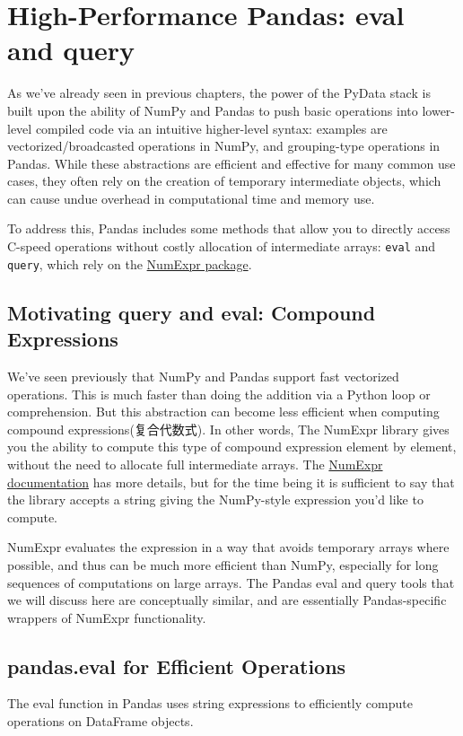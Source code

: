 \chapter{High-Performance Pandas: eval and query\label{Ch24}}
As we've already seen in previous chapters, the power of the PyData stack is built
upon the ability of NumPy and Pandas to push basic operations into lower-level compiled code via an intuitive higher-level syntax: examples are vectorized/broadcasted
operations in NumPy, and grouping-type operations in Pandas. While these abstractions are efficient and effective for many common use cases, they often rely on the
creation of temporary intermediate objects, which can cause undue overhead in computational time and memory use.

To address this, Pandas includes some methods that allow you to directly access C-speed operations without costly allocation of intermediate arrays: \verb|eval| and \verb|query|,
which rely on the \href{https://github.com/pydata/numexpr}{NumExpr package}.

\section{Motivating query and eval: Compound Expressions}
We've seen previously that NumPy and Pandas support fast vectorized operations. This is much faster than doing the addition via a Python loop or comprehension. But this abstraction can become less efficient when computing compound expressions(复合代数式). In other words,  The NumExpr library gives you the ability to compute this type of compound
expression element by element, without the need to allocate full intermediate arrays. The \href{https://numexpr.readthedocs.io/en/latest/}{NumExpr documentation} has more details, but for the time being it is sufficient
to say that the library accepts a string giving the NumPy-style expression you'd like to
compute.

NumExpr evaluates the expression in a way that avoids temporary arrays where possible, and thus can be much more efficient than NumPy,
especially for long sequences of computations on large arrays. The Pandas eval and
query tools that we will discuss here are conceptually similar, and are essentially
Pandas-specific wrappers of NumExpr functionality.

\section{pandas.eval for Efficient Operations}
The eval function in Pandas uses string expressions to efficiently compute operations
on DataFrame objects.

